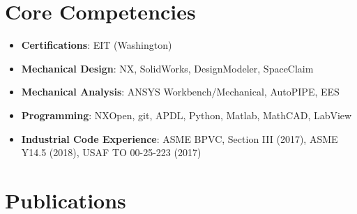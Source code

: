 \documentclass[letterpaper,11pt]{article}
\newcommand{\resumeItem}[2]{
  \item\small{
    \textbf{#1}{: #2 \vspace{-2pt}}
  }
}
\newcommand{\resumeSubItem}[2]{\resumeItem{#1}{#2}\vspace{-4pt}}
\newcommand{\resumeSubHeadingListStart}{\begin{itemize}[leftmargin=*]}
\newcommand{\resumeSubHeadingListEnd}{\end{itemize}\vspace{-5pt}}
\begin{document}
\section{Core Competencies}
  \resumeSubHeadingListStart
    \resumeSubItem{Certifications}
      {EIT (Washington)}
    \resumeSubItem{Mechanical Design}
      {NX, SolidWorks, DesignModeler, SpaceClaim}
    \resumeSubItem{Mechanical Analysis}
      {ANSYS Workbench/Mechanical, AutoPIPE, EES}
    \resumeSubItem{Programming}
      {NXOpen, git, APDL, Python, Matlab, MathCAD, LabView}
    \resumeSubItem{Industrial Code Experience}
      {ASME BPVC, Section III (2017), ASME Y14.5 (2018), USAF TO 00-25-223 (2017)}
  \resumeSubHeadingListEnd

\vspace{0pt}
\section{Publications}

\nocite{*}
\setlength{\biblabelsep}{-0pt}
\printbibliography[heading=none]
\
\end{document}
